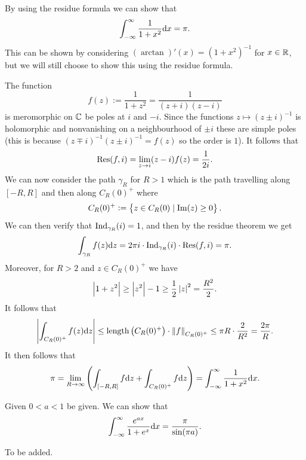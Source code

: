 \documentclass[11pt,a4paper]{article}
\begin{document}
\begin{example}
  By using the residue formula we can show that
  \[
    \int_{\ninfty}^{\infty} \frac{1}{1 + x^2} \dx = \pi.
  \]
  This can be shown by considering $(\arctan)'(x) = (1 + x^2)^{-1}$
  for $x \in \mathbb{R}$,
  but we will still choose to show this using the residue formula.

  The function
  \[
    f(z) := \frac{1}{1 + z^2} = \frac{1}{(z + i)(z - i)}
  \]
  is meromorphic on $\mathbb{C}$ be poles at $i$ and $-i$.
  Since the functions $z \mapsto (z \pm i)^{-1}$ is holomorphic
  and nonvanishing on a neighbourhood of $\pm i$ these are simple poles
  (this is because $(z \mp i)^{-1} (z \pm i)^{-1} = f(z)$ so the order
  is $1$).
  It follows that
  \[
    \operatorname{Res}(f,i) = \lim_{z \to i} (z - i) f(z) = \frac{1}{2 i}.
  \]
  We can now consider the path $\gamma_R$ for $R > 1$ which is the path
  travelling along $[-R,R]$ and then along $C_R(0)^+$ where
  \[
    C_R(0)^+ := \left\{z \in C_R(0) \mid \mathrm{Im}(z) \geq 0\right\}.
  \]
  We can then verify that $\operatorname{Ind}_{\gamma_R}(i) = 1$,
  and then by the residue theorem we get
  \[
    \int_{\gamma_R} f(z) \mathrm{d} z =
    2 \pi i \cdot \operatorname{Ind}_{\gamma_R}(i) \cdot \operatorname{Res}(f,i) =
    \pi.
  \]
  Moreover, for $R > 2$ and $z \in C_R(0)^+$ we have
  \[
    \left\lvert1 + z^2\right\rvert \geq
    \left\lvert z^2\right\rvert - 1 \geq
    \frac{1}{2} \left\lvert z\right\rvert^2 =
    \frac{R^2}{2}.
  \]
  It follows that
  \[
    \abs{\int_{C_R(0)^+} f(z) \dz} \le
    \length\del{C_R(0)^+} \cdot \norm{f}_{C_R(0)^+} \le
    \pi R \cdot \frac{2}{R^2} = \frac{2 \pi}{R}.
  \]
  It then follows that
  \[
    \pi =
    \lim_{R \to \infty} \del{\int_{[-R,R]} f \dz + \int_{C_R(0)^+} f \dz} =
    \int_{\ninfty}^{\infty} \frac{1}{1 + x^2} \dx.
  \]
\end{example}

\begin{example}
  Given $0 < a < 1$ be given.
  We can show that
  \[
    \int_{\ninfty}^{\infty} \frac{e^{ax}}{1 + e^x} \dx =
    \frac{\pi}{\sin(\pi a)}.
  \]
\end{example}

\begin{example}
  To be added.
\end{example}
\end{document}
